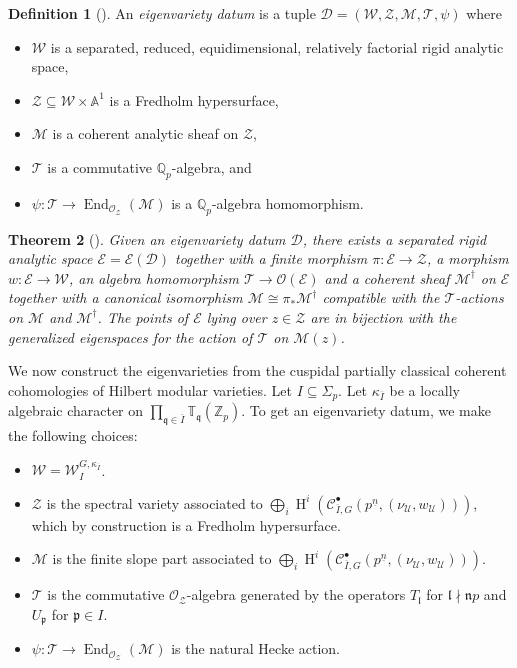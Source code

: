 \documentclass[11pt]{amsart}
\theoremstyle{definition} %
\newtheorem{definition}{Definition}[section]
\theoremstyle{plain} %
\newtheorem{theorem}[definition]{Theorem}
\theoremstyle{remark} %
\renewcommand{\AA}{\mathbb A}
\newcommand{\QQ}{{\mathbb Q}}
\newcommand{\TT}{{\mathbb T}}
\newcommand{\ZZ}{{\mathbb Z}}
\newcommand{\cC}{{\mathcal C}}
\newcommand{\cD}{{\mathcal D}}
\newcommand{\cE}{{\mathcal E}}
\newcommand{\cM}{{\mathcal M}}
\newcommand{\cO}{{\mathcal O}}
\newcommand{\cT}{{\mathcal T}}
\newcommand{\cU}{{\mathcal U}}
\newcommand{\cW}{{\mathcal W}}
\newcommand{\cZ}{{\mathcal Z}}
\newcommand{\frakl}{\mathfrak l}
\newcommand{\frakn}{\mathfrak n}
\newcommand{\frakp}{\mathfrak p}
\newcommand{\frakq}{\mathfrak q}
\newcommand{\sW}{\mathscr W}
\newcommand{\isom}{\cong} %
\DeclareMathOperator\End{End} %
\DeclareMathOperator\rH{H}
\begin{document}
\begin{definition}[{\cite[Def.~4.2.1]{Hansen}}]
An \emph{eigenvariety datum} is a tuple $\cD=(\sW, \cZ, \cM, \cT, \psi)$ where
\begin{itemize}
 \item $\sW$ is a separated, reduced, equidimensional, relatively factorial rigid analytic space,
 \item $\cZ\subseteq \sW\times \AA^1$ is a Fredholm hypersurface,
 \item $\cM$ is a coherent analytic sheaf on $\cZ$,
 \item $\cT$ is a commutative $\QQ_p$-algebra, and \
 \item $\psi\colon \cT\rightarrow \End_{\cO_\cZ}(\cM)$ is a $\QQ_p$-algebra homomorphism.
\end{itemize}
\end{definition}

\begin{theorem}[{\cite[Thm.~4.2.2]{Hansen}}]
\label{thm:eigenvariety_machine}
Given an eigenvariety datum $\cD$, there exists a separated rigid analytic space $\cE = \cE(\cD)$ together with a finite morphism $\pi\colon \cE \rightarrow \cZ$, a morphism $w\colon \cE \rightarrow \sW$, an algebra homomorphism $\cT \rightarrow \cO(\cE)$
 and a coherent sheaf $\cM^\dagger$ on $\cE$ together with a canonical isomorphism $\cM \isom \pi_\ast \cM^\dagger$ compatible with the $\cT$-actions on $\cM$ and $\cM^\dagger$.
 The points of $\cE$ lying over $z\in\cZ$ are in bijection with the generalized eigenspaces for the action of $\cT$ on $\cM(z)$.
\end{theorem}

We now construct the eigenvarieties from the cuspidal partially classical coherent cohomologies of Hilbert modular varieties.
Let $I\subseteq \Sigma_p$.
Let $\kappa_{\overline{I}}$ be a locally algebraic character on $\prod_{\frakq\in \overline{I}} \TT_{\frakq}(\ZZ_p)$.
To get an eigenvariety datum, we make the following choices:
\begin{itemize}
    \item $\sW = \cW_I^{G, \kappa_{\overline{I}}}$.
    \item $\cZ$ is the spectral variety associated to $\bigoplus_i \rH^i(\cC_{\overline{I},G}^{\bullet}(p^{\underline{n}}, (\nu_\cU,w_\cU)))$, which by construction is a Fredholm hypersurface.
    \item  $\cM$ is the finite slope part associated to $\bigoplus_i \rH^i(\cC_{\overline{I},G}^{\bullet}(p^{\underline{n}}, (\nu_\cU,w_\cU)))$.
    \item $\cT$ is the commutative $\cO_\cZ$-algebra generated by the operators $T_\frakl$ for $\frakl\nmid \frakn p$ and $U_\frakp$ for $\frakp\in I$.
    \item $\psi\colon\cT \rightarrow \End_{\cO_\cZ}(\cM)$ is the natural Hecke action.
\end{itemize}
 
\end{document}
